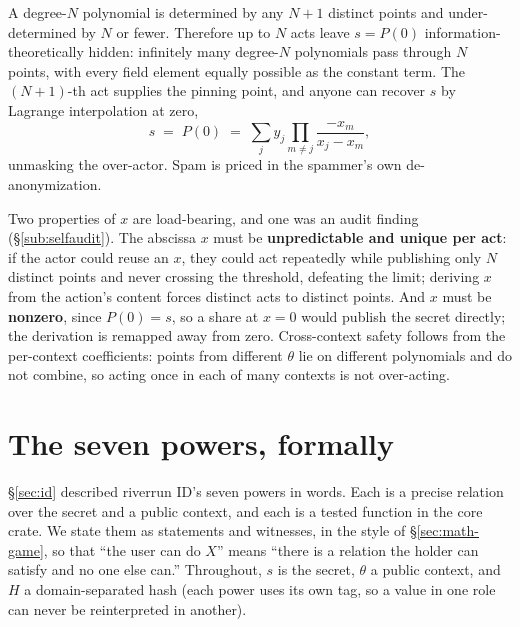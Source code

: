 \documentclass[11pt]{article}
\begin{document}
\begin{claimx}
A degree-$N$ polynomial is determined by any $N{+}1$ distinct points and under-determined
by $N$ or fewer. Therefore up to $N$ acts leave $s = P(0)$ information-theoretically
hidden: infinitely many degree-$N$ polynomials pass through $N$ points, with every field
element equally possible as the constant term. The $(N{+}1)$-th act supplies the pinning
point, and anyone can recover $s$ by Lagrange interpolation at zero,
\[ s \;=\; P(0) \;=\; \sum_{j} y_j \prod_{m \ne j} \frac{-x_m}{x_j - x_m}, \]
unmasking the over-actor. Spam is priced in the spammer's own de-anonymization.
\end{claimx}

Two properties of $x$ are load-bearing, and one was an audit finding
(\S\ref{sub:selfaudit}). The abscissa $x$ must be \textbf{unpredictable and unique per
act}: if the actor could reuse an $x$, they could act repeatedly while publishing only
$N$ distinct points and never crossing the threshold, defeating the limit; deriving $x$
from the action's content forces distinct acts to distinct points. And $x$ must be
\textbf{nonzero}, since $P(0) = s$, so a share at $x = 0$ would publish the secret
directly; the derivation is remapped away from zero. Cross-context safety follows from the
per-context coefficients: points from different $\theta$ lie on different polynomials and
do not combine, so acting once in each of many contexts is not over-acting.

\section{The seven powers, formally}
\label{sec:math-powers}

\S\ref{sec:id} described riverrun ID's seven powers in words. Each is a precise relation
over the secret and a public context, and each is a tested function in the core crate. We
state them as statements and witnesses, in the style of \S\ref{sec:math-game}, so that
``the user can do $X$'' means ``there is a relation the holder can satisfy and no one else
can.'' Throughout, $s$ is the secret, $\theta$ a public context, and $H$ a domain-separated
hash (each power uses its own tag, so a value in one role can never be reinterpreted in
another).
\end{document}
